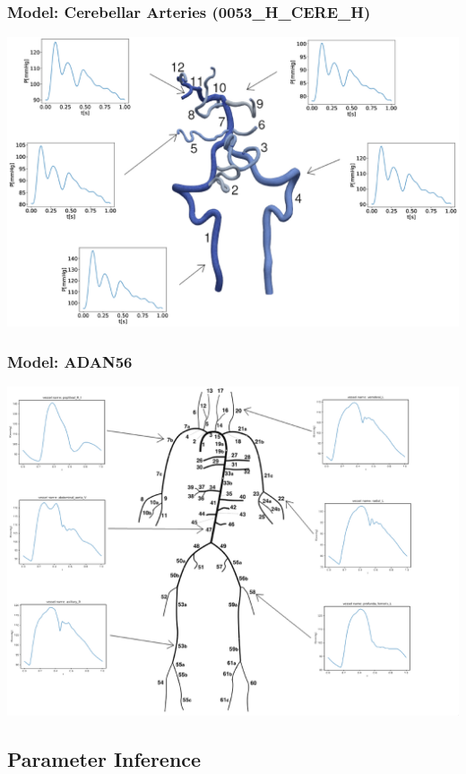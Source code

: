 \documentclass[compress]{beamer}
\begin{document}
\begin{frame}
	\frametitle{Model: Cerebellar Arteries (0053\_H\_CERE\_H)}
	\includegraphics[width=\columnwidth]{images/0053.eps}
\end{frame}
\begin{frame}
	\frametitle{Model: ADAN56}
	\includegraphics[width=\textwidth]{images/adan56.eps}
\end{frame}

\subsection{Parameter Inference}
\end{document}
